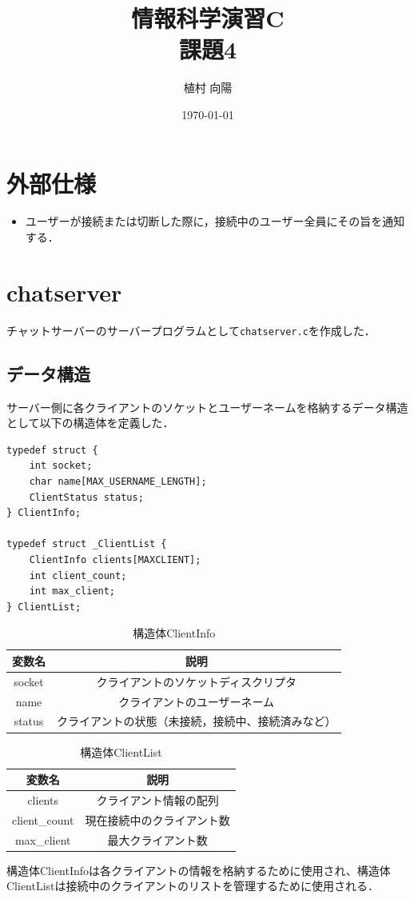 \documentclass[titlepage, 10pt]{ltjsarticle}
\title{情報科学演習C \\ 課題4}
\author{植村 向陽}
\affiliation{基礎工学部情報科学科ソフトウェア科学コース}
\date{\today}
\begin{document}
\maketitle 
\lstset{
    language=C,
    basicstyle=\ttfamily\small,
    numbers=left,
    numberstyle=\tiny,
    stepnumber=1,
    numbersep=5pt,
    frame=single,
    breaklines=true,
}
\section{外部仕様}
\begin{itemize}
    \item ユーザーが接続または切断した際に，接続中のユーザー全員にその旨を通知する．
\end{itemize}
\section{chatserver}
チャットサーバーのサーバープログラムとして\texttt{chatserver.c}を作成した．
\subsection{データ構造}
サーバー側に各クライアントのソケットとユーザーネームを格納するデータ構造として以下の構造体を定義した．
\begin{lstlisting}
typedef struct {
    int socket;
    char name[MAX_USERNAME_LENGTH];
    ClientStatus status;
} ClientInfo;

typedef struct _ClientList {
    ClientInfo clients[MAXCLIENT];
    int client_count;
    int max_client;
} ClientList;
\end{lstlisting}

\begin{table}[H]
    \centering
    \begin{tabular}{|c|c|}
        \hline
        \textbf{変数名} & \textbf{説明} \\
        \hline
        socket & クライアントのソケットディスクリプタ \\
        name & クライアントのユーザーネーム \\
        status & クライアントの状態（未接続，接続中、接続済みなど）\\
        \hline
    \end{tabular}
    \caption{構造体ClientInfo}
\end{table}

\begin{table}[H]
    \centering
    \begin{tabular}{|c|c|}
        \hline
        \textbf{変数名} & \textbf{説明} \\
        \hline
        clients & クライアント情報の配列 \\
        client\_count & 現在接続中のクライアント数 \\
        max\_client & 最大クライアント数 \\
        \hline
    \end{tabular}
    \caption{構造体ClientList}
\end{table}
構造体ClientInfoは各クライアントの情報を格納するために使用され、構造体ClientListは接続中のクライアントのリストを管理するために使用される．
\end{document}
